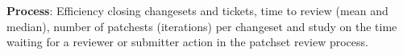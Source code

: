 \textbf{Process}: Efficiency closing changesets and tickets, time to review (mean and median), number of patchests (iterations)
per changeset and study on the time waiting for a reviewer or submitter action in the patchset review process.
